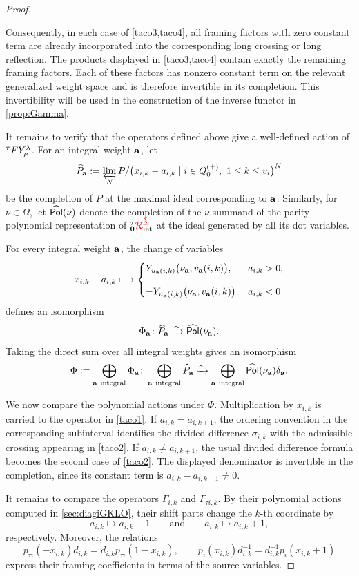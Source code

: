 \begin{proof}
\begin{itemize}
Consequently, in each case of \cref{taco3,taco4}, all framing factors
with zero constant term are already incorporated into the
corresponding long crossing or long reflection. The products displayed
in \cref{taco3,taco4} contain exactly the remaining framing factors.
Each of these factors has nonzero constant term on the relevant
generalized weight space and is therefore invertible in its
completion. This invertibility will be used in the construction of
the inverse functor in \cref{prop:Gamma}.
    \end{itemize}

It remains to verify that the operators defined above give a
well-defined action of \({}^\tau F Y_\mu^\lambda\). For an integral weight \(\mathbf{a}\), let
\[
\widehat P_{\mathbf{a}}
:=
\varprojlim_N
P/
\bigl(x_{i,k}-a_{i,k}\mid
i\in Q_0^{(+)},\ 1\leq k\leq v_i\bigr)^N
\]
be the completion of \(P\) at the maximal ideal corresponding to
\(\mathbf{a}\). Similarly, for \(\nu\in\Omega\), let
\(\widehat{\mathsf{Pol}}(\nu)\) denote the completion of the
\(\nu\)-summand of the parity polynomial representation of
\({{}^\tau_{\mathbf{0}}{\color{red}\mathcal{R}}^{{{\color{red}\underline{\lambda}}}}_{\text{int}}}\) at the ideal generated by all its dot variables.

For every integral weight \(\mathbf{a}\), the change of variables
\[
x_{i,k}-a_{i,k}
\longmapsto
\begin{cases}
\displaystyle
Y_{u_{\mathbf{a}}(i,k)}
\bigl(\nu_{\mathbf{a}},v_{\mathbf{a}}(i,k)\bigr),
& a_{i,k}>0,
\\[1em]
\displaystyle
-
Y_{u_{\mathbf{a}}(i,k)}
\bigl(\nu_{\mathbf{a}},v_{\mathbf{a}}(i,k)\bigr),
& a_{i,k}<0,
\end{cases}
\]
defines an isomorphism
\[
\Phi_{\mathbf{a}}\colon
\widehat P_{\mathbf{a}}
\xrightarrow{\sim}
\widehat{\mathsf{Pol}}(\nu_{\mathbf{a}}).
\]
Taking the direct sum over all integral weights gives an isomorphism
\[
\Phi
:=
\bigoplus_{\mathbf{a}\ \mathrm{integral}}\Phi_{\mathbf{a}}
\colon
\bigoplus_{\mathbf{a}\ \mathrm{integral}}\widehat P_{\mathbf{a}}
\xrightarrow{\sim}
\bigoplus_{\mathbf{a}\ \mathrm{integral}}
\widehat{\mathsf{Pol}}(\nu_{\mathbf{a}})\delta_{\mathbf{a}}.
\]

We now compare the polynomial actions under \(\Phi\).
Multiplication by \(x_{i,k}\) is carried to the operator in
\cref{taco1}. If \(a_{i,k}=a_{i,k+1}\), the ordering convention in the
corresponding subinterval identifies the divided difference
\(\sigma_{i,k}\) with the admissible crossing appearing in
\cref{taco2}. If \(a_{i,k}\neq a_{i,k+1}\), the usual divided
difference formula becomes the second case of \cref{taco2}. The
displayed denominator is invertible in the completion, since its
constant term is \(a_{i,k}-a_{i,k+1}\neq0\).


It remains to compare the operators \(\Gamma_{i,k}\) and
\(\Gamma_{\tau i,k}\). By their polynomial actions computed in
\cref{sec:diagiGKLO}, their shift parts change the \(k\)-th coordinate
by
\[
a_{i,k}\longmapsto a_{i,k}-1
\qquad\text{and}\qquad
a_{i,k}\longmapsto a_{i,k}+1,
\]
respectively. Moreover, the relations
\[
p_{\tau i}(-x_{i,k})d_{i,k}
=
d_{i,k}p_{\tau i}(1-x_{i,k}),
\qquad
p_i(x_{i,k})d_{i,k}^{-1}
=
d_{i,k}^{-1}p_i(x_{i,k}+1)
\]
express their framing coefficients in terms of the source variables.



\end{proof}
